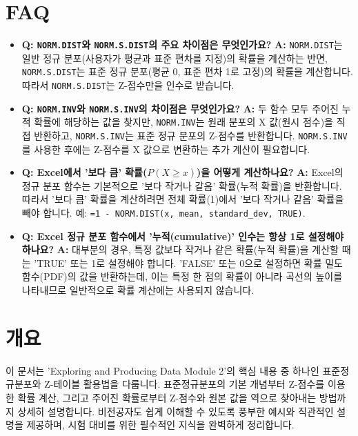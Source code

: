 \documentclass[11pt,a4paper]{article}
\begin{document}
\newpage
\section{FAQ}

\begin{itemize}
    \item \textbf{Q: \texttt{NORM.DIST}와 \texttt{NORM.S.DIST}의 주요 차이점은 무엇인가요?}
    \textbf{A:} \texttt{NORM.DIST}는 일반 정규 분포(사용자가 평균과 표준 편차를 지정)의 확률을 계산하는 반면, \texttt{NORM.S.DIST}는 표준 정규 분포(평균 0, 표준 편차 1로 고정)의 확률을 계산합니다. 따라서 \texttt{NORM.S.DIST}는 Z-점수만을 인수로 받습니다.

    \item \textbf{Q: \texttt{NORM.INV}와 \texttt{NORM.S.INV}의 차이점은 무엇인가요?}
    \textbf{A:} 두 함수 모두 주어진 누적 확률에 해당하는 값을 찾지만, \texttt{NORM.INV}는 원래 분포의 X 값(원시 점수)을 직접 반환하고, \texttt{NORM.S.INV}는 표준 정규 분포의 Z-점수를 반환합니다. \texttt{NORM.S.INV}를 사용한 후에는 Z-점수를 X 값으로 변환하는 추가 계산이 필요합니다.

    \item \textbf{Q: Excel에서 '보다 큼' 확률($P(X \ge x)$)을 어떻게 계산하나요?}
    \textbf{A:} Excel의 정규 분포 함수는 기본적으로 '보다 작거나 같음' 확률(누적 확률)을 반환합니다. 따라서 '보다 큼' 확률을 계산하려면 전체 확률(1)에서 '보다 작거나 같음' 확률을 빼야 합니다. 예: \texttt{=1 - NORM.DIST(x, mean, standard\_dev, TRUE)}.

    \item \textbf{Q: Excel 정규 분포 함수에서 '누적(cumulative)' 인수는 항상 1로 설정해야 하나요?}
    \textbf{A:} 대부분의 경우, 특정 값보다 작거나 같은 확률(누적 확률)을 계산할 때는 'TRUE' 또는 1로 설정해야 합니다. 'FALSE' 또는 0으로 설정하면 확률 밀도 함수(PDF)의 값을 반환하는데, 이는 특정 한 점의 확률이 아니라 곡선의 높이를 나타내므로 일반적으로 확률 계산에는 사용되지 않습니다.
\end{itemize}

\newpage

\section*{개요}
이 문서는 'Exploring and Producing Data Module 2'의 핵심 내용 중 하나인 표준정규분포와 Z-테이블 활용법을 다룹니다. 표준정규분포의 기본 개념부터 Z-점수를 이용한 확률 계산, 그리고 주어진 확률로부터 Z-점수와 원본 값을 역으로 찾아내는 방법까지 상세히 설명합니다. 비전공자도 쉽게 이해할 수 있도록 풍부한 예시와 직관적인 설명을 제공하며, 시험 대비를 위한 필수적인 지식을 완벽하게 정리합니다.
\end{document}
